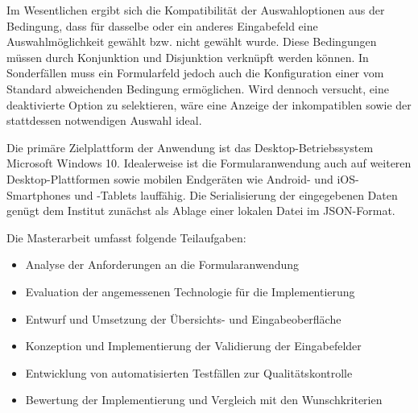 \vspace{14pt}

Im Wesentlichen ergibt sich die Kompatibilität 
der Auswahloptionen aus der Bedingung, 
dass für dasselbe oder ein anderes Eingabefeld eine Auswahlmöglichkeit gewählt bzw.
nicht gewählt wurde. Diese Bedingungen müssen durch 
Konjunktion und Disjunktion verknüpft werden können.
In Sonderfällen muss ein Formularfeld jedoch auch 
die Konfiguration einer vom Standard abweichenden Bedingung
ermöglichen. 
Wird dennoch versucht,
eine deaktivierte Option zu selektieren, wäre eine Anzeige der
inkompatiblen sowie der stattdessen notwendigen Auswahl ideal.

\vspace{14pt}
Die primäre Zielplattform der Anwendung ist das Desktop-Betriebssystem
Microsoft Windows 10.
Idealerweise ist die Formularanwendung auch auf weiteren Desktop-Plattformen sowie
mobilen Endgeräten wie Android- und iOS-Smartphones und -Tablets
lauffähig. Die Serialisierung der eingegebenen Daten genügt dem Institut 
zunächst als Ablage einer lokalen Datei im JSON-Format. 


\vspace{14pt}
Die Masterarbeit umfasst folgende Teilaufgaben:
\begin{itemize}
    \itemsep0em
\item Analyse der Anforderungen an die Formularanwendung
\item Evaluation der angemessenen Technologie für die Implementierung
\item Entwurf und Umsetzung der Übersichts- und Eingabeoberfläche
\item Konzeption und Implementierung der Validierung der Eingabefelder
\item Entwicklung von automatisierten Testfällen zur Qualitätskontrolle
\item Bewertung der Implementierung und Vergleich mit den Wunschkriterien
\end{itemize}








